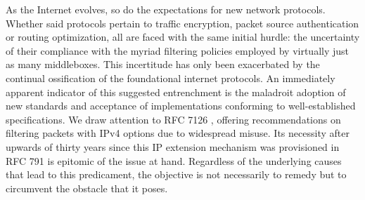 As the Internet evolves, so do the expectations for new network protocols. Whether said protocols pertain to traffic encryption, packet source authentication or routing optimization, all are faced with the same initial hurdle: the uncertainty of their compliance with the myriad filtering policies employed by virtually just as many middleboxes. This incertitude has only been exacerbated by the continual ossification of the foundational internet protocols. An immediately apparent indicator of this suggested entrenchment is the maladroit adoption of new standards and acceptance of implementations conforming to well-established specifications. We draw attention to RFC 7126 \cite{RFC7126}, offering recommendations on filtering packets with IPv4 options due to widespread misuse. Its necessity after upwards of thirty years since this IP extension mechanism was provisioned in RFC 791 \cite{RFC0791} is epitomic of the issue at hand. Regardless of the underlying causes that lead to this predicament, the objective is not necessarily to remedy but to circumvent the obstacle that it poses.

